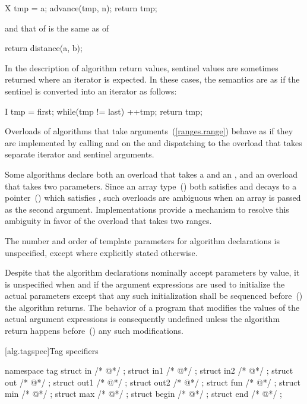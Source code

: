 \begin{codeblock}
X tmp = a;
advance(tmp, n);
return tmp;
\end{codeblock}

and that of
is the same as of

\begin{codeblock}
return distance(a, b);
\end{codeblock}

\pnum
In the description of algorithm return values, sentinel values are sometimes
returned where an iterator is expected. In these cases, the semantics are as
if the sentinel is converted into an iterator as follows:

\begin{codeblock}
I tmp = first;
while(tmp != last)
  ++tmp;
return tmp;
\end{codeblock}

\pnum
Overloads of algorithms that take  arguments~(\ref{ranges.range})
behave as if they are implemented by calling  and  on
the  and dispatching to the overload that takes separate
iterator and sentinel arguments.

\pnum
Some algorithms declare both an overload that takes a 
and an , and an overload that takes two 
parameters. Since an array type~() both satisfies
 and decays to a pointer~() which satisfies
, such overloads are ambiguous when an array is passed as
the second argument. Implementations provide a mechanism to resolve
this ambiguity in favor of the overload that takes two ranges.

\pnum
The number and order of template parameters for algorithm declarations
is unspecified, except where explicitly stated otherwise.

\pnum
Despite that the algorithm declarations nominally accept parameters
by value, it is unspecified when and if the argument expressions are used to
initialize the actual parameters except that any such initialization shall be
sequenced before~() the algorithm returns.
\enternote The behavior of a program that modifies the values of the actual
argument expressions is consequently undefined unless the algorithm return
happens before~() any such modifications. \exitnote

[alg.tagspec]{Tag specifiers}

\begin{itemdecl}
namespace tag {
  struct in { /* @\impdef@ */ };
  struct in1 { /* @\impdef@ */ };
  struct in2 { /* @\impdef@ */ };
  struct out { /* @\impdef@ */ };
  struct out1 { /* @\impdef@ */ };
  struct out2 { /* @\impdef@ */ };
  struct fun { /* @\impdef@ */ };
  struct min { /* @\impdef@ */ };
  struct max { /* @\impdef@ */ };
  struct begin { /* @\impdef@ */ };
  struct end { /* @\impdef@ */ };
}
\end{itemdecl}

